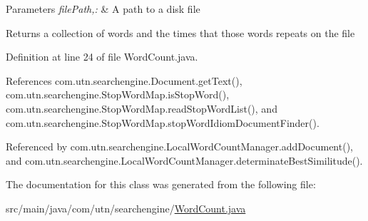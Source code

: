 \begin{DoxyParams}{\-Parameters}
{\em file\-Path,\-:} & \-A path to a disk file \\
\hline
\end{DoxyParams}
\begin{DoxyReturn}{\-Returns}
a collection of words and the times that those words repeats on the file 
\end{DoxyReturn}


\-Definition at line 24 of file \-Word\-Count.\-java.



\-References com.\-utn.\-searchengine.\-Document.\-get\-Text(), com.\-utn.\-searchengine.\-Stop\-Word\-Map.\-is\-Stop\-Word(), com.\-utn.\-searchengine.\-Stop\-Word\-Map.\-read\-Stop\-Word\-List(), and com.\-utn.\-searchengine.\-Stop\-Word\-Map.\-stop\-Word\-Idiom\-Document\-Finder().



\-Referenced by com.\-utn.\-searchengine.\-Local\-Word\-Count\-Manager.\-add\-Document(), and com.\-utn.\-searchengine.\-Local\-Word\-Count\-Manager.\-determinate\-Best\-Similitude().



\-The documentation for this class was generated from the following file\-:\begin{DoxyCompactItemize}
\item 
src/main/java/com/utn/searchengine/\hyperlink{_word_count_8java}{\-Word\-Count.\-java}\end{DoxyCompactItemize}
